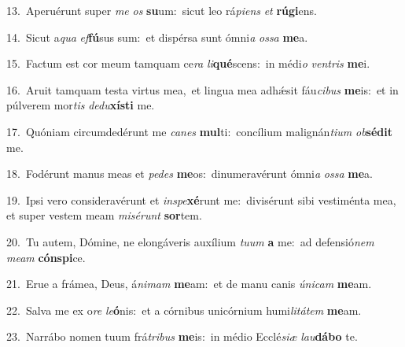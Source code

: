 {\numbfont\textcolor{\numbcolor}{13.}}~Aperuérunt super \textit{me} \textit{os} \textbf{su}\-um:~\star sicut leo rá\-\textit{pi}\-\textit{ens} \textit{et} \textbf{rú}\-\textbf{gi}ens.\par
{\numbfont\textcolor{\numbcolor}{14.}}~Sicut a\textit{qua} \textit{ef}\-\textbf{fú}sus sum:~\star et dispérsa sunt ómni\textit{a} \textit{os}\-\textit{sa} \textbf{me}\-a.\par
{\numbfont\textcolor{\numbcolor}{15.}}~Factum est cor meum tamquam ce\textit{ra} \textit{li}\-\textbf{qué}scens:~\star in médi\textit{o} \textit{ven}\-\textit{tris} \textbf{me}\-i.\par
{\numbfont\textcolor{\numbcolor}{16.}}~Aruit tamquam testa virtus mea,~\dagger et lingua mea adhǽsit fáu\-\textit{ci}\-\textit{bus} \textbf{me}\-is:~\star et in púlverem mor\textit{tis} \textit{de}\-\textit{du}\textbf{xís}\textbf{ti} me.\par
{\numbfont\textcolor{\numbcolor}{17.}}~Quóniam circumdedérunt me \textit{ca}\-\textit{nes} \textbf{mul}\-ti:~\star concílium malignán\-\textit{ti}\-\textit{um} \textit{ob}\-\textbf{sé}\textbf{dit} me.\par
{\numbfont\textcolor{\numbcolor}{18.}}~Fodérunt manus meas et \textit{pe}\-\textit{des} \textbf{me}\-os:~\star dinumeravérunt ómni\textit{a} \textit{os}\-\textit{sa} \textbf{me}\-a.\par
{\numbfont\textcolor{\numbcolor}{19.}}~Ipsi vero consideravérunt et \textit{in}\-\textit{spe}\textbf{xé}runt me:~\star divisérunt sibi vestiménta mea, et super vestem meam \textit{mi}\-\textit{sé}\textit{runt} \textbf{sor}\-tem.\par
{\numbfont\textcolor{\numbcolor}{20.}}~Tu autem, Dómine, ne elongáveris auxílium \textit{tu}\-\textit{um} \textbf{a} me:~\star ad defensió\textit{nem} \textit{me}\-\textit{am} \textbf{cón}\-\textbf{spi}ce.\par
{\numbfont\textcolor{\numbcolor}{21.}}~Erue a frámea, Deus, á\-\textit{ni}\-\textit{mam} \textbf{me}\-am:~\star et de manu canis \textit{ú}\-\textit{ni}\textit{cam} \textbf{me}\-am.\par
{\numbfont\textcolor{\numbcolor}{22.}}~Salva me ex o\textit{re} \textit{le}\-\textbf{ó}nis:~\star et a córnibus unicórnium humi\-\textit{li}\-\textit{tá}\textit{tem} \textbf{me}\-am.\par
{\numbfont\textcolor{\numbcolor}{23.}}~Narrábo nomen tuum frá\-\textit{tri}\-\textit{bus} \textbf{me}\-is:~\star in médio Ecclé\-\textit{si}\-\textit{æ} \textit{lau}\-\textbf{dá}\textbf{bo} te.\par
